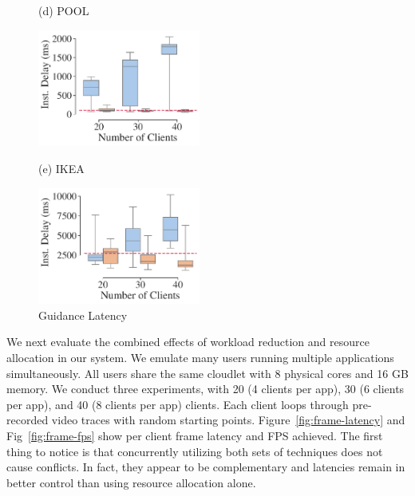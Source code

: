 \begin{figure}
\begin{turn}{90}{\hspace{0.6in}\small (d) POOL}\end{turn}\hspace{0.2in}\includegraphics[width=2.1in, trim=0em 0em 0em 0em, clip]{FIGS/fig-sec6-latency-pool.pdf}\\[0.08in]
\begin{turn}{90}{\hspace{0.6in}\small (e) IKEA}\end{turn}\hspace{0.2in}\includegraphics[width=2.1in, trim=0em 0em 0em 0em, clip]{FIGS/fig-sec6-latency-ikea.pdf}
  \vspace{-0.1in}
\caption{\small Guidance Latency}
\label{figs:inst-delay}
\end{figure}
		
We next evaluate the combined effects of workload reduction and
resource allocation in our system. We emulate many users running
multiple applications simultaneously. All users share the same
cloudlet with 8 physical cores and 16 GB memory. We conduct three experiments,
with 20 (4 clients per app), 30 (6 clients per app), and 40 (8 clients
per app) clients. Each client loops through pre-recorded video traces
with random starting points.  Figure~\ref{fig:frame-latency} and
Fig~\ref{fig:frame-fps} show per client frame latency and FPS
achieved. The first thing to notice is that concurrently utilizing
both sets of techniques does not cause conflicts. In fact, they appear
to be complementary and latencies remain in better control than using
resource allocation alone.

